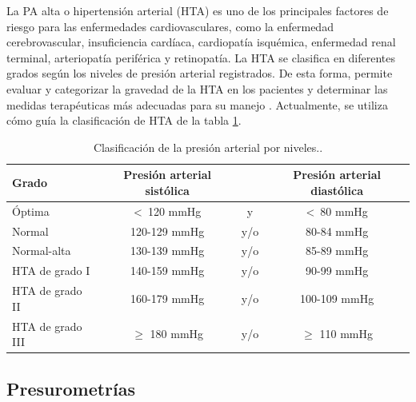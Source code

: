 \filbreak
La PA alta o hipertensión arterial (HTA) es uno de los principales factores de riesgo para las enfermedades 
cardiovasculares, como la enfermedad cerebrovascular, insuficiencia cardíaca, cardiopatía isquémica, 
enfermedad renal terminal, arteriopatía periférica y retinopatía. 
La HTA se clasifica en diferentes grados según los niveles de presión arterial registrados. 
De esta forma, permite evaluar y categorizar la gravedad de la HTA en los pacientes y determinar las medidas 
terapéuticas más adecuadas para su manejo \citep{CITE:6} \citep{CITE:7}. 
Actualmente, se utiliza cómo guía la clasificación de HTA de la tabla \ref{tab:TablaHTA}.

\begin{table}[h]
	\centering
	\caption[Clasificación de la presión arterial por niveles]{Clasificación de la presión arterial por niveles.\protect\footnotemark.}
	\begin{tabular}{l c c c}    
		\toprule
		\textbf{Grado} 	      & \textbf{Presión arterial sistólica} 	& \textbf{}	& \textbf{Presión arterial diastólica}  \\
		\midrule
		Óptima                & <\ 120 mmHg                           & 	y			  & <\ 80 mmHg \\		
    Normal                & 120-129 mmHg                          &  	y/o			& 80-84 mmHg \\	
    Normal-alta           & 130-139 mmHg                          & 	y/o			& 85-89 mmHg \\	
    HTA de grado I        & 140-159 mmHg                          & 	y/o			& 90-99 mmHg \\
    HTA de grado II       & 160-179 mmHg                          & 	y/o			& 100-109 mmHg \\		
    HTA de grado III      & $\geq$  180 mmHg                      & 	y/o			& $\geq$  110 mmHg \\	
		\bottomrule
		\hline
	\end{tabular}
	\label{tab:TablaHTA}
\end{table}


\subsection{Presurometrías}

